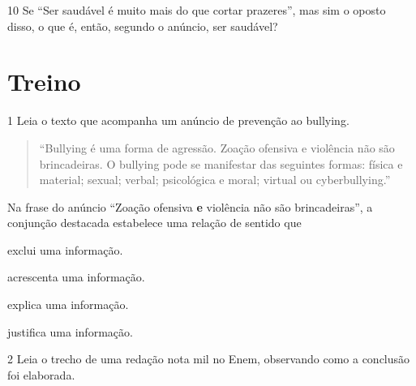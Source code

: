 
\num{10} Se ``Ser saudável é muito mais do que cortar prazeres'', mas
sim o oposto disso, o que é, então, segundo o anúncio, ser saudável?


\section{Treino}

\num{1} Leia o texto que acompanha um anúncio de prevenção ao bullying.


\begin{quote}
``Bullying é uma forma de agressão. Zoação ofensiva e violência não são
brincadeiras. O bullying pode se manifestar das seguintes formas: física
e material; sexual; verbal; psicológica e moral; virtual ou
cyberbullying.''
\end{quote}

Na frase do anúncio ``Zoação ofensiva \textbf{e} violência não são
brincadeiras'', a conjunção destacada estabelece uma relação de sentido
que

\begin{escolha}
\item exclui uma informação.

\item acrescenta uma informação.

\item explica uma informação.

\item justifica uma informação.

\end{escolha}

\num{2} Leia o trecho de uma redação nota mil no Enem, observando como a
conclusão foi elaborada.


